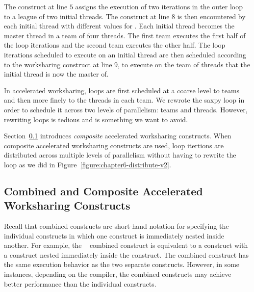 The  construct at line $5$ assigns the execution of two
iterations in the outer loop to a league of two initial threads.  The
 construct at line $8$ is then encountered by each initial
thread with different values for .  Each initial thread becomes the master
thread in a team of four threads.  The first team executes the first half of
the loop iterations and the second team executes the other half.  The loop
iterations scheduled to execute on an initial thread are then scheduled
according to the  worksharing construct at line $9$, to execute on
the team of threads that the initial thread is now the master of.

In accelerated worksharing, loops are first scheduled at a coarse level to
teams and then more finely to the threads in each team.  We rewrote the saxpy
loop in order to schedule it across two levels of parallelism: teams and
threads.  However, rewriting loops is tedious and is something we want to avoid.

Section~\ref{ssec:06.composite-worksharing-loop-construct} introduces
\emph{composite} accelerated worksharing constructs.  When composite
accelerated worksharing constructs are used, loop itertions are distributed
across multiple levels of parallelism without having to rewrite the loop as we
did in Figure~\ref{figure:chapter6-distribute-v2}.  

\subsection{Combined and Composite Accelerated Worksharing Constructs}
\label{ssec:06.composite-worksharing-loop-construct}

Recall that combined constructs are short-hand notation for specifying the
individual constructs in which one construct is immediately nested inside another.
For example, the ~ combined construct is equivalent to
a  construct with a  construct nested immediately
inside the  construct.  The combined construct has the same
execution behavior as the two separate constructs.  However, in some instances,
depending on the compiler, the combined constructs may achieve better
performance than the individual constructs.

